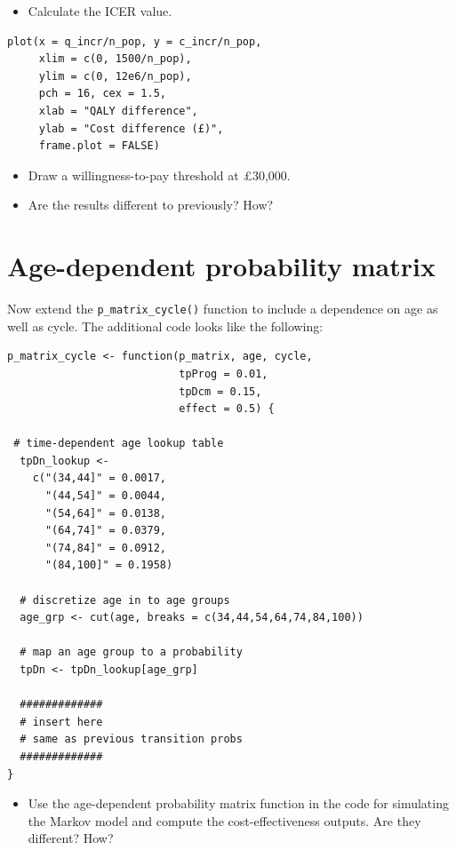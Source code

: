 \begin{itemize}
\item Calculate the ICER value.
\end{itemize}

\begin{verbatim}
plot(x = q_incr/n_pop, y = c_incr/n_pop,
     xlim = c(0, 1500/n_pop),
     ylim = c(0, 12e6/n_pop),
     pch = 16, cex = 1.5,
     xlab = "QALY difference",
     ylab = "Cost difference (£)",
     frame.plot = FALSE)
\end{verbatim}

\begin{itemize}
\item Draw a willingness-to-pay threshold at £30,000.
\item Are the results different to previously? How?
\end{itemize}

%
\section{Age-dependent probability matrix}
Now extend the \texttt{p\_matrix\_cycle()} function to include a dependence on age as well as cycle.
The additional code looks like the following:

\begin{verbatim}
p_matrix_cycle <- function(p_matrix, age, cycle,
                           tpProg = 0.01,
                           tpDcm = 0.15,
                           effect = 0.5) {
  
 # time-dependent age lookup table
  tpDn_lookup <-
    c("(34,44]" = 0.0017,
      "(44,54]" = 0.0044,
      "(54,64]" = 0.0138,
      "(64,74]" = 0.0379,
      "(74,84]" = 0.0912,
      "(84,100]" = 0.1958)
  
  # discretize age in to age groups
  age_grp <- cut(age, breaks = c(34,44,54,64,74,84,100))
  
  # map an age group to a probability
  tpDn <- tpDn_lookup[age_grp]
  
  #############
  # insert here
  # same as previous transition probs
  #############
}
\end{verbatim}

\begin{itemize}
\item Use the age-dependent probability matrix function in the code for simulating the Markov model and compute the cost-effectiveness outputs. Are they different? How?
\end{itemize}


